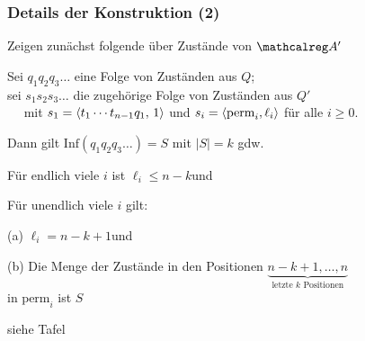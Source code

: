 \begin{frame}
  \frametitle{Details der Konstruktion (2)}

  Zeigen zunächst folgende  über Zustände von $\Aut{A}'$

  \par\bigskip
  \begin{block}{}
    Sei $q_1q_2q_3\dots$ eine Folge von Zuständen aus $Q$; \\
    sei $s_1s_2s_3\dots$ die zugehörige Folge von Zuständen aus $Q'$\\
    \quad~~ mit $s_1 = \langle t_1\cdots t_{n-1}q_1,\,1\rangle$ und $s_i = \langle \text{perm}_i,\ell_i\rangle$ für alle $i \geqslant 0$.

    \par\bigskip
    Dann gilt $\text{Inf}(q_1q_2q_3\dots) = S$ mit $|S|=k$ gdw.\
    \begin{Enumerate}
      \item
        Für endlich viele $i$ ist $\ell_i \leqslant n-k$\quad und
      \item
        Für unendlich viele $i$ gilt:
        \begin{Itemize}
          \item[(a)]
            $\ell_i = n-k+1$\quad und
          \item[(b)]
            Die Menge der Zustände in den Positionen $\underbrace{n-k+1,\dots,n}_{\text{letzte $k$ Positionen}}$\\[-12pt]
            in $\text{perm}_i$ ist $S$
        \end{Itemize}
    \end{Enumerate}
  \end{block}

  \par\bigskip
  siehe Tafel \Tafel

\end{frame}

